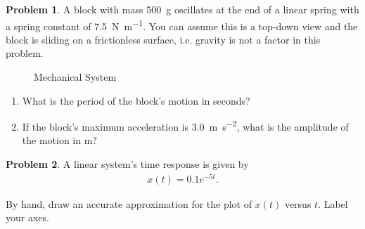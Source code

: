 \documentclass[10pt]{article}
\theoremstyle{definition}
\newtheorem{prob}{Problem}[section]
\newenvironment{subprob}%
{\renewcommand{\theenumi}{\alph{enumi}}\renewcommand{\labelenumi}{(\theenumi)}\begin{enumerate}}%
{\end{enumerate}}%
\begin{document}
\clearpage\newpage

\begin{prob}
    A block with mass \SI{500}{\gram} oscillates at the end of a linear spring with a spring constant of \SI{7.5}{\newton\per\meter}.
    You can assume this is a top-down view and the block is sliding on a frictionless surface, i.e. gravity is not a factor in this problem.


    \begin{figure}[h]
        \centering
        \begin{scaletikzpicturetowidth}{0.5\textwidth}
        \end{scaletikzpicturetowidth}
        \caption{Mechanical System~\label{fig:mechanical_system}}
    \end{figure}

    \begin{subprob}
    \item What is the period of the block's motion in seconds?
    \item If the block's maximum acceleration is \SI{3.0}{\meter\per\second\squared}, what is the amplitude of the motion in \si{\meter}?
    \end{subprob}
\end{prob}

\clearpage\newpage

\begin{prob}
    A linear system's time response is given by
    \begin{align*}
        x(t) = 0.1 e^{-5t} .
    \end{align*}

    By hand, draw an accurate approximation for the plot of \( x(t) \) versus \( t \).
    Label your axes.
\end{prob}
\end{document}
